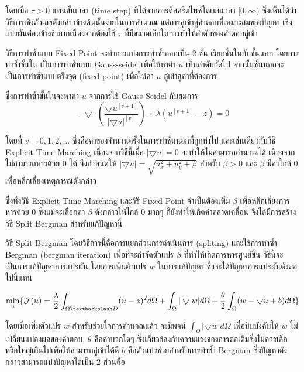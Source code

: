 \documentclass[hidelinks,a4paper,14pt]{article}
\numberwithin{equation}{section}							%
\begin{document}
{\hspace{1cm} โดยเมื่อ $\tau>0$ แทนขั้นเวลา (time step) ที่ได้จากการดิสครีตไทซ์โดเมนเวลา $[0,\infty)$ ซึ่งเห็นได้ว่าวิธีการเชิงตัวเลขดังกล่าวข้างต้นนั้นง่ายในการคํานวณ แต่การลู่เข้าสู่คําตอบที่เหมาะสมของปัญหา เชิงแปรผันค่อนข้างช้ามากเนื่องจากต้องใช้ $\tau$ ที่มีขนาดเล็กในการทำให้ลำดับของคำตอบลู่เข้า 

\hspace{1cm}วิธีการทำซ้ำแบบ Fixed Point \cite{ref:FixpointSolver} จะทำการแบ่งการทำซ้ำออกเป็น  2 ชั้น เรียกชั้นในกับชั้นนอก โดยการทำซ้ำชั้นใน เป็นการทำซ้ำแบบ Gauss-seidel เพื่อให้หาค่า $u$ เป็นลำดับถัดไป จากนั้นชั้นนอกจะเป็นการทำซ้ำแบบตรึงจุด (fixed point) เพื่อให้ค่า $u$ ลู่เข้าสู่ค่าที่ต้องการ 

\hspace{1cm}ซึ่งการทำซ้ำชั้นในจะหาค่า $u$ จากการใช้ Gauss-Seidel กับสมการ
$$
- \bigtriangledown\cdot\left(\frac{\bigtriangledown u^{[v+1]}}{{| \bigtriangledown u |}^{[v]} }\right) + \lambda(u^{[v+1]}-z)  = 0
$$

โดยที่ $v = 0,1,2,... $ ซึ่งคือค่าของจำนวนครั้งในการทำชั้นนอกที่ถูกทำไป และเช่นเดียวกับวิธี Explicit Time Marching เนื่องจากวิธีนี้เมื่อ $| \bigtriangledown u |  = 0 $ จะทำให้ไม่สามารถคำนวณได้ เนื่องจากไม่สามารถหารด้วย 0 ได้ จึงกำหนดให้ $| \bigtriangledown u | = \sqrt{u_x^2+u_y^2 + \beta}$ สำหรับ $\beta > 0$ และ $\beta$ มีค่าใกล้ 0 เพื่อหลีกเลี่ยงเหตุการณ์ดังกล่าว

\hspace{1cm} ซึ่งทั้งวิธี Explicit Time Marching และวิธี Fixed Point จำเป็นต้องเพิ่ม $\beta$ เพื่อหลีกเลี่ยงการหารด้วย 0 ซึ่งแม้จะเลือกค่า $\beta$  ดังกล่าวให้ใกล้ 0 มากๆ ก็ยังทำให้เกิดค่าคลาดเคลื่อน  จึงได้มีการสร้างวิธี Split Bergman สำหรับแก้ปัญหานี้

\hspace{1cm} วิธี Split Bergman \cite{ref:splitbergman-inpaint} โดยวิธีการนี้คือการแยกส่วนการดำเนินการ (spliting) และใช้การทำซ้ำ Bergman (bergman iteration)  เพื่อที่จะกำจัดตัวแปร $\beta$ ที่ทำให้เกิดการหารศูนย์ขึ้น วิธีนี้จะเป็นการแก้ปัญหาการแปรผัน โดยการเพิ่มตัวแปร $w$ ในการแก้ปัญหา ซึ่งจะได้ปัญหาการแปรผันดังต่อไปนี้แทน

$$\min_{u} \{ \mathcal{J}(u) = \frac{\lambda}{2} \int_{\Omega \textbackslash D} (u-z)^2 d\Omega +  \int_{\Omega}  |\bigtriangledown w|  d\Omega + \frac{\theta}{2} \int_{\Omega} (w - \bigtriangledown u + b) d\Omega \}$$

โดยเมื่อเพิ่มตัวแปร $w$ สำหรับช่วยใจการคำนวณแล้ว จะมีพจน์ $ \int_{\Omega}  |\bigtriangledown w|  d\Omega$ เพื่อบีบบังคับให้ $w$ ไม่เปลี่ยนแปลงผลของคำตอบ, $\theta$ คือค่าบวกใดๆ ซึ่งเกี่ยวข้องกับความแรงของการต่อเติมซึ่งไม่ควรเล็กหรือใหญ่เกินไปเพื่อให้สามารถลู่เข้าได้ดี $b$ คือตัวแปรช่วยสำหรับการทำซ้ำ Bergman ซึ่งปัญหาดังกล่าวสามารถแบ่งปัญหาได้เป็น 2 ส่วนคือ

}
\end{document}

